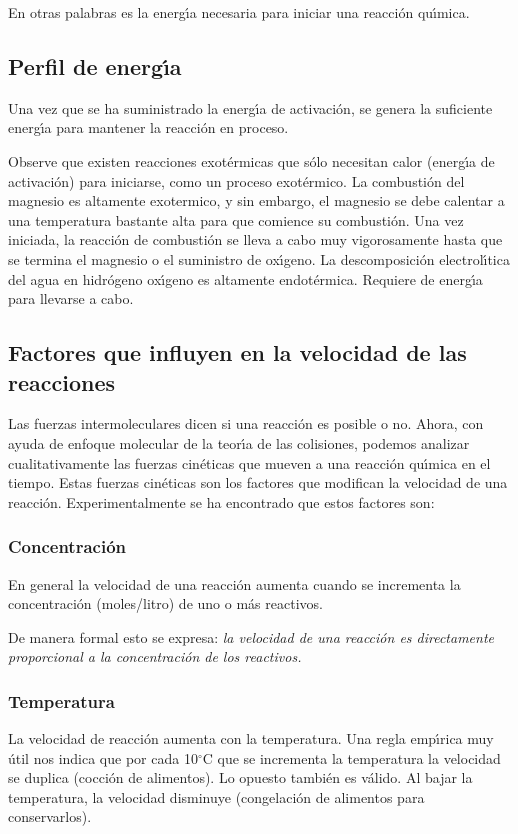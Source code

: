 En otras palabras es la energ\'{\i}a necesaria para iniciar una reacci\'on qu\'{\i}\-mica.

\subsection{Perfil de energ\'{\i}a}
Una vez que se ha suministrado la energ\'{\i}a de activaci\'on, se genera la suficiente energ\'{\i}a para mantener la reacci\'on en proceso.

Observe que existen reacciones exot\'ermicas que s\'olo necesitan calor (e\-ner\-g\'{\i}\-a de activaci\'on) para iniciarse, como un proceso exot\'ermico. La com\-bus\-ti\'on del magnesio es altamente \gls{exotermico}, y sin embargo, el magnesio se debe calentar a una temperatura bastante alta para que comience su combusti\'on.  Una vez iniciada, la reacci\'on de combusti\'on   se lleva a cabo muy vigorosamente hasta que se termina el magnesio o el sumi\-nistro de ox\'{\i}geno. La descomposici\'on electrol\'{\i}tica del agua en hidr\'ogeno  ox\'{\i}geno es altamente endot\'ermica. Requiere de energ\'{\i}a  para llevarse a cabo.

\subsection[Factores que influyen en la velocidad]{Factores que influyen en la velocidad de las reacciones}
Las fuerzas intermoleculares dicen si una reacci\'on es posible o no. Ahora, con ayuda de enfoque molecular de la teor\'{\i}a de las colisiones, podemos analizar cualitativamente las fuerzas cin\'eticas que mueven a una reacci\'on qu\'{\i}mica en el tiempo. Estas fuerzas cin\'eticas son los factores que mo\-di\-fican la velocidad de una reacci\'on. Experimentalmente se ha encontrado que estos factores son:

\subsubsection{Concentraci\'on}
En general la velocidad de una reacci\'on  aumenta cuando se incrementa la concentraci\'on (moles/litro) de uno o m\'as reactivos.

De manera formal esto se expresa: \textit{la velocidad de una reacci\'on es directamente proporcional  a la concentraci\'on de los reactivos.} 
\subsubsection{Temperatura}
La velocidad de reacci\'on aumenta con la temperatura.
Una regla emp\'{\i}rica muy \'util nos indica que por cada 10$^\circ$C que se incrementa la temperatura la velocidad se duplica (cocci\'on de alimentos).  Lo opuesto tambi\'en es v\'alido. Al bajar la temperatura, la velocidad dismi\-nuye (congelaci\'on de alimentos para conservarlos).

